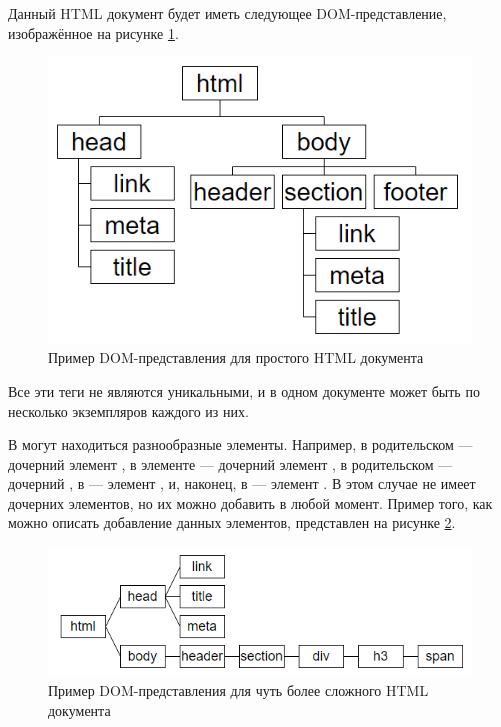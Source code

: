 Данный HTML документ будет иметь следующее DOM-представление, изображённое на рисунке \ref{fig:simple-dom-1}.

\begin{figure}[h]
	\centering
	\captionsetup{justification=centering}
	\includegraphics[width=130mm]{img/simple-dom-1.png}
	\caption{Пример DOM-представления для простого HTML документа}
	\label{fig:simple-dom-1}
\end{figure}

Все эти теги не являются уникальными, и в одном документе может быть по несколько экземпляров каждого из них.

В  могут находиться разнообразные элементы.
Например, в родительском  --- дочерний элемент , в элементе  --- дочерний элемент , в родительском  --- дочерний , в  --- элемент , и, наконец, в  — элемент .
В этом случае  не имеет дочерних элементов, но их можно добавить в любой момент.
Пример того, как можно описать добавление данных элементов, представлен на рисунке \ref{fig:simple-dom-2}.

\begin{figure}[h]
	\centering
	\captionsetup{justification=centering}
	\includegraphics[width=120mm]{img/simple-dom-2.png}
	\caption{Пример DOM-представления для чуть более сложного HTML документа}
	\label{fig:simple-dom-2}
\end{figure}

